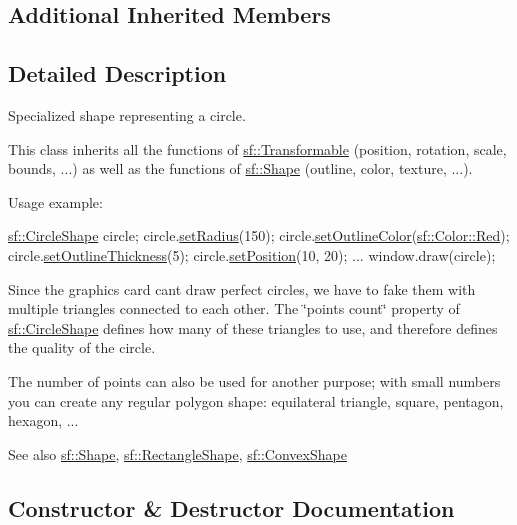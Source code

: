 \subsection*{Additional Inherited Members}


\subsection{Detailed Description}
Specialized shape representing a circle. 

This class inherits all the functions of \hyperlink{classsf_1_1_transformable}{sf\+::\+Transformable} (position, rotation, scale, bounds, ...) as well as the functions of \hyperlink{classsf_1_1_shape}{sf\+::\+Shape} (outline, color, texture, ...).

Usage example\+: 
\begin{DoxyCode}
\hyperlink{classsf_1_1_circle_shape}{sf::CircleShape} circle;
circle.\hyperlink{classsf_1_1_circle_shape_a21cdf85fc2f201e10222a241af864be0}{setRadius}(150);
circle.\hyperlink{classsf_1_1_shape_a5978f41ee349ac3c52942996dcb184f7}{setOutlineColor}(\hyperlink{classsf_1_1_color_a127dbf55db9c07d0fa8f4bfcbb97594a}{sf::Color::Red});
circle.\hyperlink{classsf_1_1_shape_a5ad336ad74fc1f567fce3b7e44cf87dc}{setOutlineThickness}(5);
circle.\hyperlink{classsf_1_1_transformable_a4dbfb1a7c80688b0b4c477d706550208}{setPosition}(10, 20);
...
window.draw(circle);
\end{DoxyCode}


Since the graphics card can\textquotesingle{}t draw perfect circles, we have to fake them with multiple triangles connected to each other. The \char`\"{}points count\char`\"{} property of \hyperlink{classsf_1_1_circle_shape}{sf\+::\+Circle\+Shape} defines how many of these triangles to use, and therefore defines the quality of the circle.

The number of points can also be used for another purpose; with small numbers you can create any regular polygon shape\+: equilateral triangle, square, pentagon, hexagon, ...

\begin{DoxySeeAlso}{See also}
\hyperlink{classsf_1_1_shape}{sf\+::\+Shape}, \hyperlink{classsf_1_1_rectangle_shape}{sf\+::\+Rectangle\+Shape}, \hyperlink{classsf_1_1_convex_shape}{sf\+::\+Convex\+Shape} 
\end{DoxySeeAlso}


\subsection{Constructor \& Destructor Documentation}
\mbox{\label{classsf_1_1_circle_shape_aaebe705e7180cd55588eb19488af3af1}} 
